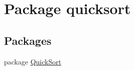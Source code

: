 \hypertarget{namespacequicksort}{}\section{Package quicksort}
\label{namespacequicksort}
\subsection*{Packages}
\begin{DoxyCompactItemize}
\item 
package \hyperlink{namespacequicksort_1_1_quick_sort}{Quick\+Sort}
\end{DoxyCompactItemize}
